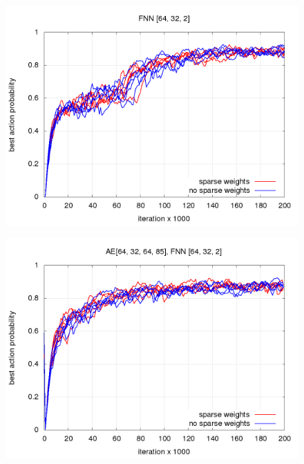 \documentclass[10pt,a4paper]{article}
\begin{document}
\begin{figure}[!htb]
\centering
\begin{minipage}{.5\textwidth}
  \centering
  \includegraphics[scale=0.3]{../../results/rl_arcade/fnn_progress/training_progress.png}
  \label{img:FNN progress comparison}
\end{minipage}%
\begin{minipage}{.5\textwidth}
  \centering
  \includegraphics[scale=0.3]{../../results/rl_arcade/hnn_progress/training_progress.png}
  \label{img:AE+FNN progress comparison}
\end{minipage}
\end{figure}
\end{document}
